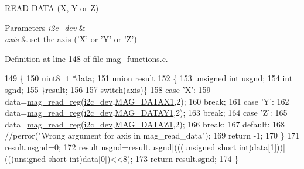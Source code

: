 R\-E\-A\-D D\-A\-T\-A (X, Y or Z) 


\begin{DoxyParams}{Parameters}
{\em i2c\-\_\-dev} & \\
\hline
{\em axis} & set the axis ('X' or 'Y' or 'Z') \\
\hline
\end{DoxyParams}


Definition at line 148 of file mag\-\_\-functions.\-c.


\begin{DoxyCode}
149 \{
150   uint8\_t *data;
151   \textcolor{keyword}{union }result
152   \{
153     \textcolor{keywordtype}{unsigned} \textcolor{keywordtype}{int} usgnd;
154     \textcolor{keywordtype}{int} sgnd;
155   \}result;
156 
157   \textcolor{keywordflow}{switch}(axis)\{
158     \textcolor{keywordflow}{case} \textcolor{charliteral}{'X'}:
159       data=\hyperlink{group__mag_ga6830eaeae2298320e1e8c902e4edd709}{mag\_read\_reg}(\hyperlink{CommunicationV0_2communication_8c_a7751bd45ac1064efb35adf1f19c25db8}{i2c\_dev},\hyperlink{communication_2imu__regs_8h_a4f883328e7ae117996e334145ddd0032}{MAG\_DATAX1},2);
160       \textcolor{keywordflow}{break};
161     \textcolor{keywordflow}{case} \textcolor{charliteral}{'Y'}:
162       data=\hyperlink{group__mag_ga6830eaeae2298320e1e8c902e4edd709}{mag\_read\_reg}(\hyperlink{CommunicationV0_2communication_8c_a7751bd45ac1064efb35adf1f19c25db8}{i2c\_dev},\hyperlink{communication_2imu__regs_8h_ae218906702b1e40c2b6970f97dd0cfe4}{MAG\_DATAY1},2);
163       \textcolor{keywordflow}{break};
164     \textcolor{keywordflow}{case} \textcolor{charliteral}{'Z'}:
165       data=\hyperlink{group__mag_ga6830eaeae2298320e1e8c902e4edd709}{mag\_read\_reg}(\hyperlink{CommunicationV0_2communication_8c_a7751bd45ac1064efb35adf1f19c25db8}{i2c\_dev},\hyperlink{communication_2imu__regs_8h_a81d7d9236ec69a1a229e4fa7c6299fde}{MAG\_DATAZ1},2);
166       \textcolor{keywordflow}{break};
167     \textcolor{keywordflow}{default}:
168       \textcolor{comment}{//perror("Wrong argument for axis in mag\_read\_data");}
169       \textcolor{keywordflow}{return} -1;
170   \}
171   result.usgnd=0;
172   result.usgnd=result.usgnd|(((\textcolor{keywordtype}{unsigned} \textcolor{keywordtype}{short} int)data[1]))|(((\textcolor{keywordtype}{unsigned} \textcolor{keywordtype}{short} \textcolor{keywordtype}{int})data[0])<<8);
173   \textcolor{keywordflow}{return} result.sgnd;
174 \}
\end{DoxyCode}
